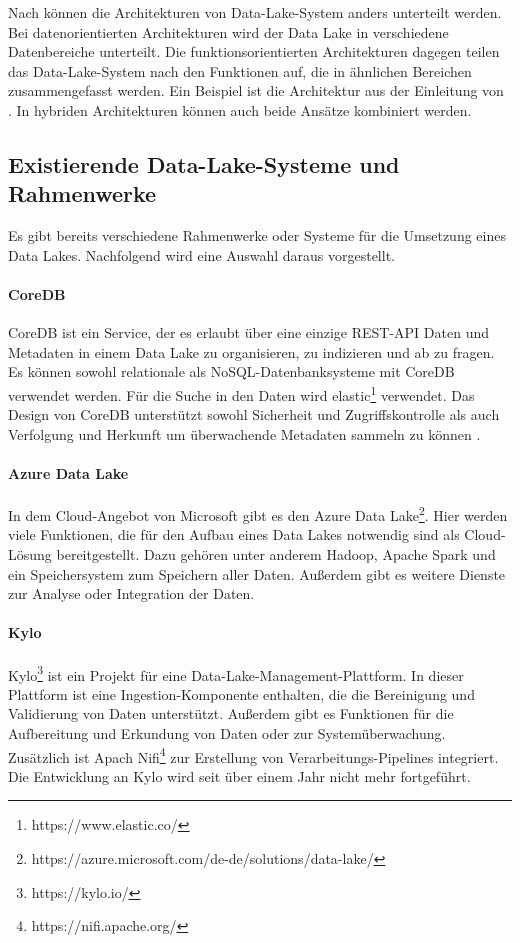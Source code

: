 Nach \textcite{sawadogo2021data} können die Architekturen von Data-Lake-System anders unterteilt werden.
Bei datenorientierten Architekturen wird der Data Lake in verschiedene Datenbereiche unterteilt.
Die funktionsorientierten Architekturen dagegen teilen das Data-Lake-System nach den Funktionen auf, die in ähnlichen Bereichen zusammengefasst werden.
Ein Beispiel ist die Architektur aus der Einleitung von \textcite{datalake_03}.
In hybriden Architekturen können auch beide Ansätze kombiniert werden.

\subsection{Existierende Data-Lake-Systeme und Rahmenwerke}
Es gibt bereits verschiedene Rahmenwerke oder Systeme für die Umsetzung eines Data Lakes.
Nachfolgend wird eine Auswahl daraus vorgestellt.

\paragraph{CoreDB} CoreDB ist ein Service, der es erlaubt über eine einzige REST-API Daten und Metadaten in einem Data Lake zu organisieren, zu indizieren und ab zu fragen. 
Es können sowohl relationale als NoSQL-Datenbanksysteme mit CoreDB verwendet werden.
Für die Suche in den Daten wird elastic\footnote{https://www.elastic.co/} verwendet.
Das Design von CoreDB unterstützt sowohl Sicherheit und Zugriffskontrolle als auch Verfolgung und Herkunft um überwachende Metadaten sammeln zu können \parencite{coredb}.

\paragraph{Azure Data Lake} In dem Cloud-Angebot von Microsoft gibt es den Azure Data Lake\footnote{https://azure.microsoft.com/de-de/solutions/data-lake/}.
Hier werden viele Funktionen, die für den Aufbau eines Data Lakes notwendig sind als Cloud-Lösung bereitgestellt.
Dazu gehören unter anderem Hadoop, Apache Spark und ein Speichersystem zum Speichern aller Daten.
Außerdem gibt es weitere Dienste zur Analyse oder Integration der Daten.

\paragraph{Kylo} Kylo\footnote{https://kylo.io/} ist ein Projekt für eine Data-Lake-Management-Plattform.
In dieser Plattform ist eine Ingestion-Komponente enthalten, die die Bereinigung und Validierung von Daten unterstützt.
Außerdem gibt es Funktionen für die Aufbereitung und Erkundung von Daten oder zur Systemüberwachung.
Zusätzlich ist Apach Nifi\footnote{https://nifi.apache.org/} zur Erstellung von Verarbeitungs-Pipelines integriert.
Die Entwicklung an Kylo wird seit über einem Jahr nicht mehr fortgeführt.

